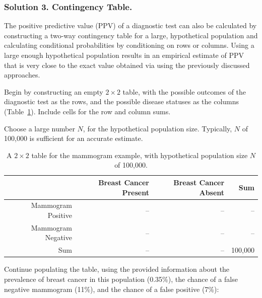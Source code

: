 \subsubsection{Solution 3. Contingency Table.}

The positive predictive value (PPV) of a diagnostic test can also be calculated by constructing a two-way contingency table for a large, hypothetical population and calculating conditional probabilities by conditioning on rows or columns. Using a large enough hypothetical population results in an empirical estimate of PPV that is very close to the exact value obtained via using the previously discussed approaches.

Begin by constructing an empty $2 \times 2$ table, with the possible outcomes of the diagnostic test as the rows, and the possible disease statuses as the columns (Table~\ref{tableMammogramSetup}). Include cells for the row and column sums.

Choose a large number $N$, for the hypothetical population size. Typically, $N$ of 100,000 is sufficient for an accurate estimate. 

\begin{table}[ht]
	\centering
	\begin{tabular}{rrrr}
		\hline
		& Breast Cancer Present & Breast Cancer Absent & Sum \\ 
		\hline
		Mammogram Positive & -- & -- & -- \\ 
		Mammogram Negative & -- & -- & -- \\ 
		Sum & -- & -- & 100,000 \\ 
		\hline
	\end{tabular}
	\caption{A $2 \times 2$ table for the mammogram example, with hypothetical population size $N$ of 100,000.}
	\label{tableMammogramSetup}
\end{table}

Continue populating the table, using the provided information about the prevalence of breast cancer in this population (0.35\%), the chance of a false negative mammogram (11\%), and the chance of a false positive (7\%):

